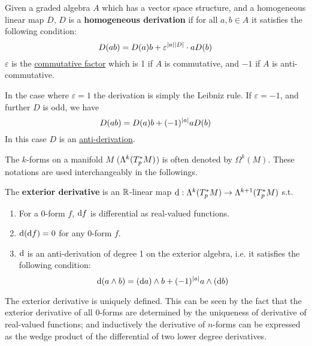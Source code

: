 \documentclass{article}
\begin{document}
\begin{definition}
    Given a graded algebra $A$ which has a vector space structure, and a homogeneous linear map $D$, $D$ is a \textbf{homogeneous derivation} if for all $a, b \in A$ it satisfies the following condition:
    \[
        D(ab) = D(a)b + \varepsilon^{\left|a\right|\left|D\right|} \cdot aD(b)
    \]
    $\varepsilon$ is the \underline{commutative factor} which is 1 if $A$ is commutative, and $-1$ if $A$ is anti-commutative. 
\end{definition}

\begin{remark}
    In the case where $\varepsilon = 1$ the derivation is simply the Leibniz rule. If $\varepsilon = -1$, and further $D$ is odd, we have
    \[
        D(ab) = D(a)b + (-1)^{\left|a\right|} aD(b)
    \]
    In this case $D$ is an \underline{anti-derivation}.
\end{remark}

\begin{notation}
    The $k$-forms on a manifold $M$ ($\Lambda^k(T_p^{\ast} M)$) is often denoted by $\Omega^k(M)$. These notations are used interchangeably in the followings. 
\end{notation}

\begin{definition}
    The \textbf{exterior derivative} is an $\mathbb{R}$-linear map $\mathrm{d}: \Lambda^k(T_p^{\ast} M) \to \Lambda^{k + 1}(T_p^{\ast} M)$ s.t.
    \begin{enumerate}[label=\arabic*)]
        \item For a 0-form $f$, $\mathrm{d} f$ is differential as real-valued functions.
        \item $\mathrm{d}(\mathrm{d} f) = 0$ for any 0-form $f$.
        \item $\mathrm{d}$ is an anti-derivation of degree 1 on the exterior algebra, i.e. it satisfies the following condition:
        \[
            \mathrm{d}(a \wedge b) = (\mathrm{d} a) \wedge b + (-1)^{\left|a\right|} a \wedge (\mathrm{d} b)
        \]
    \end{enumerate}
\end{definition}

\begin{remark}
    The exterior derivative is uniquely defined. This can be seen by the fact that the exterior derivative of all $0$-forms are determined by the uniqueness of derivative of real-valued functions; and inductively the derivative of $n$-forms can be expressed as the wedge product of the differential of two lower degree derivatives. 
\end{remark}
\end{document}
